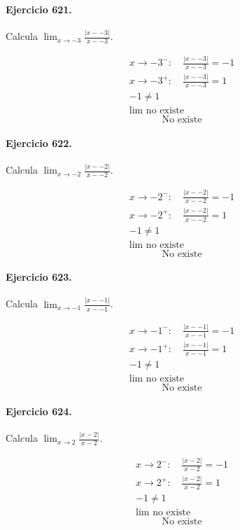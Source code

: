 \documentclass[11pt,a4paper]{article}
\begin{document}
\paragraph{Ejercicio 621.} Calcula $\displaystyle\lim_{x\to -3}\frac{|x--3|}{x--3}$. 

\[
\begin{aligned}
x\to -3^-:\quad \frac{|x--3|}{x--3}=-1\\
x\to -3^+:\quad \frac{|x--3|}{x--3}=1\\
-1\ne1\\
\lim\text{{ no existe}}
\end{aligned}
\]
\[\boxed{\text{{No existe}}}\]


\paragraph{Ejercicio 622.} Calcula $\displaystyle\lim_{x\to -2}\frac{|x--2|}{x--2}$. 

\[
\begin{aligned}
x\to -2^-:\quad \frac{|x--2|}{x--2}=-1\\
x\to -2^+:\quad \frac{|x--2|}{x--2}=1\\
-1\ne1\\
\lim\text{{ no existe}}
\end{aligned}
\]
\[\boxed{\text{{No existe}}}\]


\paragraph{Ejercicio 623.} Calcula $\displaystyle\lim_{x\to -1}\frac{|x--1|}{x--1}$. 

\[
\begin{aligned}
x\to -1^-:\quad \frac{|x--1|}{x--1}=-1\\
x\to -1^+:\quad \frac{|x--1|}{x--1}=1\\
-1\ne1\\
\lim\text{{ no existe}}
\end{aligned}
\]
\[\boxed{\text{{No existe}}}\]


\paragraph{Ejercicio 624.} Calcula $\displaystyle\lim_{x\to 2}\frac{|x-2|}{x-2}$. 

\[
\begin{aligned}
x\to 2^-:\quad \frac{|x-2|}{x-2}=-1\\
x\to 2^+:\quad \frac{|x-2|}{x-2}=1\\
-1\ne1\\
\lim\text{{ no existe}}
\end{aligned}
\]
\[\boxed{\text{{No existe}}}\]
\end{document}
